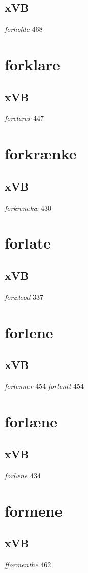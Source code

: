 \documentclass[a4paper,twocolumn]{article}
\begin{document}
\subsection{xVB}
\label{sec:org45beb89}
\emph{forholde} 468 
\section{forklare}
\label{sec:org51c64ed}
\subsection{xVB}
\label{sec:org17f79c2}
\emph{forclarer} 447 
\section{forkrænke}
\label{sec:org059af4b}
\subsection{xVB}
\label{sec:orgbd8224e}
\emph{forkrenckæ} 430 
\section{forlate}
\label{sec:orgedfecfa}
\subsection{xVB}
\label{sec:org8a3cb90}
\emph{forælood} 337 
\section{forlene}
\label{sec:org7a8eae4}
\subsection{xVB}
\label{sec:orgfe9cab4}
\emph{forlenner} 454 \emph{forlentt} 454 
\section{forlæne}
\label{sec:org52d3d17}
\subsection{xVB}
\label{sec:orgebff198}
\emph{forlæne} 434 
\section{formene}
\label{sec:org84ac03d}
\subsection{xVB}
\label{sec:org3370bdd}
\emph{fformenthe} 462 
\end{document}
